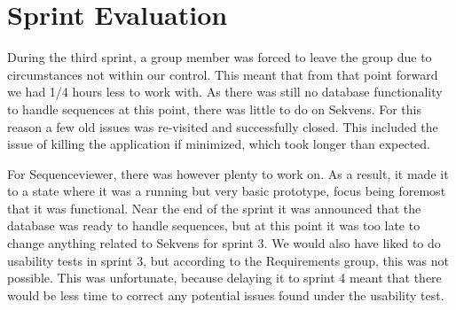\section{Sprint Evaluation}
During the third sprint, a group member was forced to leave the group due to circumstances not within our control. This meant that from that point forward we had 1/4 hours less to work with.
As there was still no database functionality to handle sequences at this point, there was little to do on Sekvens. For this reason a few old issues was re-visited and successfully closed. This included the issue of killing the application if minimized, which took longer than expected.

For Sequenceviewer, there was however plenty to work on. As a result, it made it to a state where it was a running but very basic prototype, focus being foremost that it was functional. 
Near the end of the sprint it was announced that the database was ready to handle sequences, but at this point it was too late to change anything related to Sekvens for sprint 3.
We would also have liked to do usability tests in sprint 3, but according to the Requirements group, this was not possible. This was unfortunate, because delaying it to sprint 4 meant that there would be less time to correct any potential issues found under the usability test. 